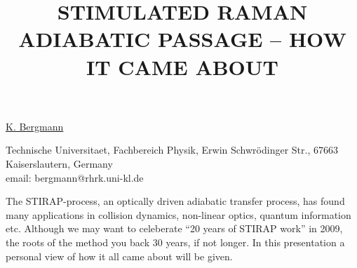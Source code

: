 \title{STIMULATED RAMAN ADIABATIC PASSAGE -- HOW IT CAME ABOUT}

\underline{K. Bergmann}


Technische Universitaet,
Fachbereich Physik,
Erwin Schwr\"{o}dinger Str.,
67663 Kaiserslautern,
Germany\\
email: bergmann@rhrk.uni-kl.de

The STIRAP-process, an optically driven adiabatic transfer process, has found many applications in collision dynamics, non-linear optics, quantum information etc. Although we may want to celeberate ``20 years of STIRAP work'' in 2009, the roots of the method you back 30 years, if not longer. In this presentation a personal view of how it all came about will be given.

\vspace{\baselineskip}